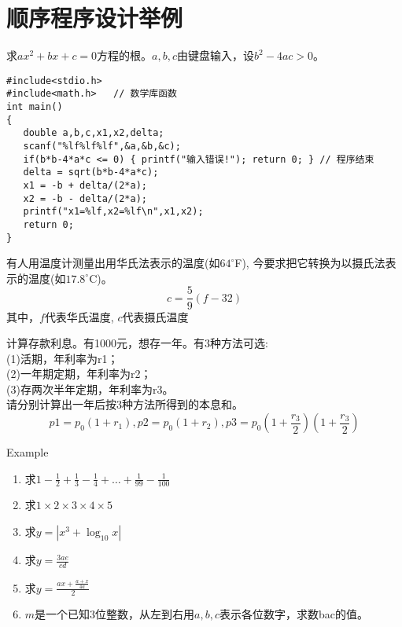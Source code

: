 \section{顺序程序设计举例}

\begin{frame}[fragile]
\begin{example}[例3.5 p64]
	求$ax^2+bx+c=0$方程的根。$a,b,c$由键盘输入，设$b^2-4ac>0$。
\end{example}
\begin{lstlisting}
#include<stdio.h>
#include<math.h>   // 数学库函数        
int main()                   
{                            
   double a,b,c,x1,x2,delta;
   scanf("%lf%lf%lf",&a,&b,&c);
   if(b*b-4*a*c <= 0) { printf("输入错误!"); return 0; } // 程序结束
   delta = sqrt(b*b-4*a*c);
   x1 = -b + delta/(2*a);
   x2 = -b - delta/(2*a);
   printf("x1=%lf,x2=%lf\n",x1,x2);
   return 0;           
}                            
\end{lstlisting}
\end{frame}

\begin{frame}[shrink]
\begin{example}[例3.1 p37]
	有人用温度计测量出用华氏法表示的温度(如$64^\circ$F), 
	今要求把它转换为以摄氏法表示的温度(如$17.8^\circ$C)。
	\[ c=\frac{5}{9}(f-32) \]
	其中，$f$代表华氏温度, $c$代表摄氏温度
\end{example}
\begin{example}[例3.2 p38]
	计算存款利息。有1000元，想存一年。有3种方法可选:\\
	(1)活期，年利率为r1；\\
	(2)一年期定期，年利率为r2；\\
	(3)存两次半年定期，年利率为r3。\\
	请分别计算出一年后按3种方法所得到的本息和。\\
	\[p1=p_0(1+r_1),p2=p_0(1+r_2),p3=p_0(1+\frac{r_3}{2})(1+\frac{r_3}{2}) \]
\end{example}
\end{frame}

\begin{frame}[shrink]{Example}
\begin{enumerate}
	\item 求$1-\frac{1}{2}+\frac{1}{3}-\frac{1}{4}+\dots+\frac{1}{99}-\frac{1}{100}$\\
	\item 求$1\times 2\times 3\times 4\times 5$\\
	\item 求$y=|x^3+\log_{10} x|$\\
	\item 求$y=\frac{3ae}{cd}$\\
	\item 求$y=\frac{ax+\frac{a+x}{4a}}{2}$\\
	\item $m$是一个已知3位整数，从左到右用$a,b,c$表示各位数字，求数bac的值。
\end{enumerate}
\end{frame}




